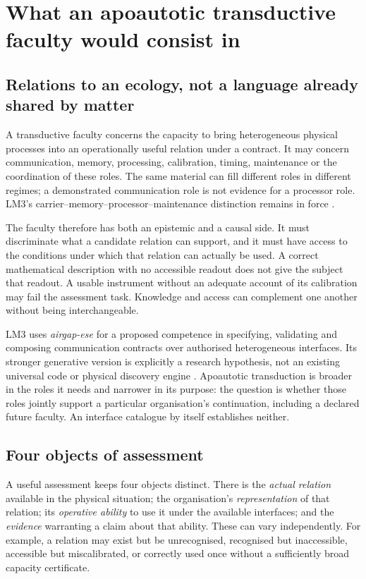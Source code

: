 \section{What an apoautotic transductive faculty would consist in}
\label{sec:faculty}

\subsection{Relations to an ecology, not a language already shared by matter}

A transductive faculty concerns the capacity to bring heterogeneous physical processes into an operationally useful relation under a contract. It may concern communication, memory, processing, calibration, timing, maintenance or the coordination of these roles. The same material can fill different roles in different regimes; a demonstrated communication role is not evidence for a processor role. LM3's carrier--memory--processor--maintenance distinction remains in force \cite[\S5]{LM3}.

The faculty therefore has both an epistemic and a causal side. It must discriminate what a candidate relation can support, and it must have access to the conditions under which that relation can actually be used. A correct mathematical description with no accessible readout does not give the subject that readout. A usable instrument without an adequate account of its calibration may fail the assessment task. Knowledge and access can complement one another without being interchangeable.

LM3 uses \emph{airgap-ese} for a proposed competence in specifying, validating and composing communication contracts over authorised heterogeneous interfaces. Its stronger generative version is explicitly a research hypothesis, not an existing universal code or physical discovery engine \cite[\S\S9,11]{LM3}. Apoautotic transduction is broader in the roles it needs and narrower in its purpose: the question is whether those roles jointly support a particular organisation's continuation, including a declared future faculty. An interface catalogue by itself establishes neither.

\subsection{Four objects of assessment}

A useful assessment keeps four objects distinct. There is the \emph{actual relation} available in the physical situation; the organisation's \emph{representation} of that relation; its \emph{operative ability} to use it under the available interfaces; and the \emph{evidence} warranting a claim about that ability. These can vary independently. For example, a relation may exist but be unrecognised, recognised but inaccessible, accessible but miscalibrated, or correctly used once without a sufficiently broad capacity certificate.

